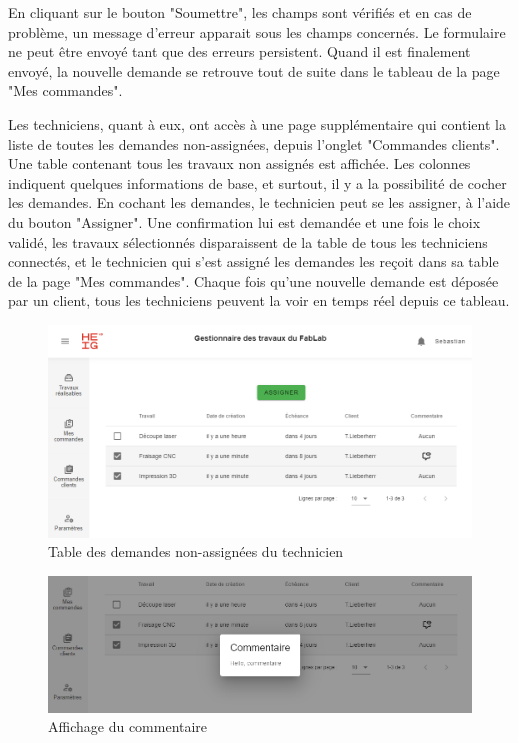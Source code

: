 \documentclass[
    iai, %
    eai, %
]{heig-tb}
\begin{document}
En cliquant sur le bouton "Soumettre", les champs sont vérifiés et en cas de problème, un message d'erreur apparait sous les champs concernés.
Le formulaire ne peut être envoyé tant que des erreurs persistent. Quand il est finalement envoyé, la nouvelle demande se retrouve tout de suite dans le tableau de la page "Mes commandes".

Les techniciens, quant à eux, ont accès à une page supplémentaire qui contient la liste de toutes les demandes non-assignées, depuis l'onglet "Commandes clients".
Une table contenant tous les travaux non assignés est affichée. Les colonnes indiquent quelques informations de base, et surtout, il y a la possibilité de cocher les demandes. En cochant les demandes, le technicien peut se les assigner, à l'aide du bouton "Assigner". Une confirmation lui est demandée et une fois le choix validé, les travaux sélectionnés disparaissent de la table de tous les techniciens connectés, et le technicien qui s'est assigné les demandes les reçoit dans sa table de la page "Mes commandes".
Chaque fois qu'une nouvelle demande est déposée par un client, tous les techniciens peuvent la voir en temps réel depuis ce tableau.

\begin{figure}[h]
  \includegraphics[width=14cm]{ui_alljobs_page.PNG}
  \caption{Table des demandes non-assignées du technicien}
\end{figure}

\begin{figure}[h]
  \includegraphics[width=14cm]{ui_alljobs_comment.PNG}
  \caption{Affichage du commentaire}
\end{figure}
\end{document}
